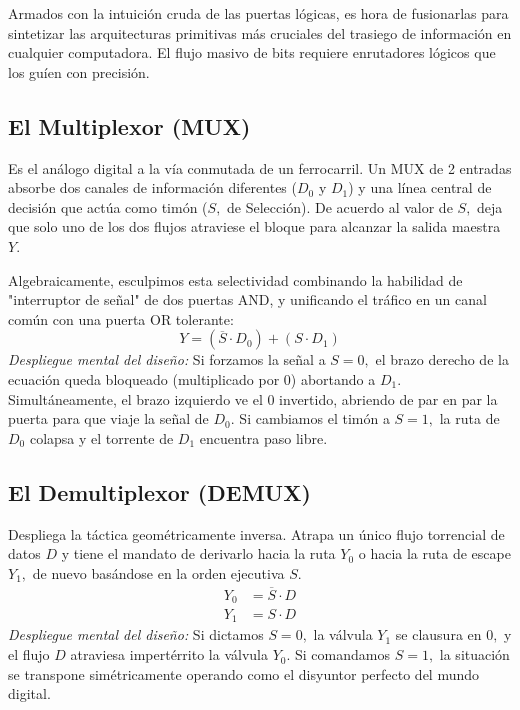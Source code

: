 Armados con la intuición cruda de las puertas lógicas, es hora de fusionarlas para sintetizar las arquitecturas primitivas más cruciales del trasiego de información en cualquier computadora. El flujo masivo de bits requiere enrutadores lógicos que los guíen con precisión.

\subsection{El Multiplexor (MUX)}
Es el análogo digital a la vía conmutada de un ferrocarril. Un MUX de 2 entradas absorbe dos canales de información diferentes ($D_0$ y $D_1$) y una línea central de decisión que actúa como timón ($S,$ de Selección). De acuerdo al valor de $S,$ deja que solo uno de los dos flujos atraviese el bloque para alcanzar la salida maestra $Y.$

Algebraicamente, esculpimos esta selectividad combinando la habilidad de "interruptor de señal" de dos puertas AND, y unificando el tráfico en un canal común con una puerta OR tolerante:
\[ Y = (\overline{S} \cdot D_0) + (S \cdot D_1) \]
\textit{Despliegue mental del diseño:} Si forzamos la señal a $S=0,$ el brazo derecho de la ecuación queda bloqueado (multiplicado por $0$) abortando a $D_1.$ Simultáneamente, el brazo izquierdo ve el $0$ invertido, abriendo de par en par la puerta para que viaje la señal de $D_0.$ Si cambiamos el timón a $S=1,$ la ruta de $D_0$ colapsa y el torrente de $D_1$ encuentra paso libre.

\subsection{El Demultiplexor (DEMUX)}
Despliega la táctica geométricamente inversa. Atrapa un único flujo torrencial de datos $D$ y tiene el mandato de derivarlo hacia la ruta $Y_0$ o hacia la ruta de escape $Y_1,$ de nuevo basándose en la orden ejecutiva $S.$ 
\begin{align*}
Y_0 &= \overline{S} \cdot D \\
Y_1 &= S \cdot D
\end{align*}
\textit{Despliegue mental del diseño:} Si dictamos $S=0,$ la válvula $Y_1$ se clausura en $0,$ y el flujo $D$ atraviesa impertérrito la válvula $Y_0.$ Si comandamos $S=1,$ la situación se transpone simétricamente operando como el disyuntor perfecto del mundo digital.
